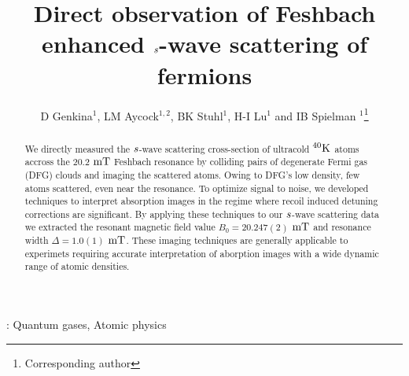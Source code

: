 \documentclass[12pt]{iopart}
\begin{document}
\newcommand{\swave}[0]{$\it{s}$-wave }
\newcommand{\pwave}[0]{$\it{p}$-wave }
\newcommand{\K}{ $^{40}\rm{K}$}
\newcommand{\Rb}{ $^{87}\rm{Rb}$}
\newcommand{\us}{$\rm{\mu s}$} 
\newcommand{\mT}{$\rm{mT}$}
\newcommand{\ez}{$\bf{\hat{e}_z}$}
\newcommand{\um}{$\rm{\mu m}$} 

\title[]{Direct observation of Feshbach enhanced \swave scattering of fermions}

\author{D Genkina$^1$, LM Aycock$^{1,2}$, BK Stuhl$^1$, H-I Lu$^1$ and IB Spielman
$^1$\footnote{Corresponding author}}

\address{$^1$Joint Quantum Institute, National Institute of Standards and Technology, and University of Maryland, Gaithersburg, MD, 20899 USA}
\address{$^2$Physics Department, Cornell University, Ithaca, NY 14850 USA}


\begin{abstract}
We directly measured the \swave{} scattering cross-section of ultracold \K{} atoms accross the 20.2 \mT{} Feshbach resonance by colliding pairs of degenerate Fermi gas (DFG) clouds and imaging the scattered atoms. Owing to DFG's low density, few atoms scattered, even near the resonance. To optimize signal to noise, we developed techniques to interpret absorption images in the regime where recoil induced 
detuning corrections are significant. By applying these techniques to our \swave{} scattering data we extracted the resonant magnetic
field value  $B_0 = 20.247(2)$  \mT{} and resonance width $\Delta = 1.0(1)$  \mT{}. These imaging techniques are generally applicable to experimets requiring accurate interpretation of aborption images with a wide dynamic range of atomic densities. 
\end{abstract}

\vspace{2pc}
: Quantum gases, Atomic physics

\maketitle
\end{document}
